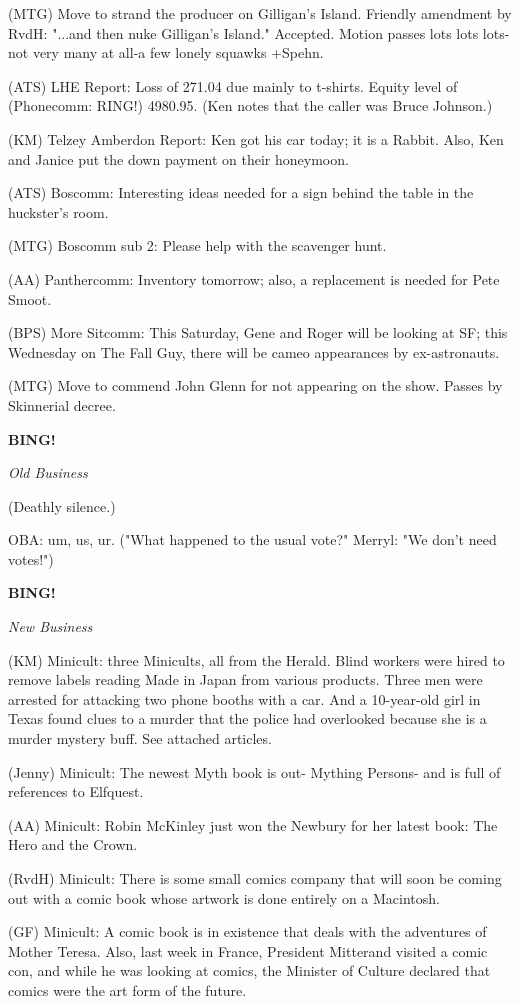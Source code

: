 \documentclass[12pt]{article}
\newcommand{\bing}{{\bf BING!} }
\newcommand{\goto}[1]{\bing \vskip 12pt \centerline{{\em{#1}}}}
\begin{document}
(MTG) Move to strand the producer on Gilligan's Island. Friendly amendment by RvdH: "...and then nuke Gilligan's Island." Accepted. Motion passes lots lots lots-not very many at all-a few lonely squawks +Spehn.

(ATS) LHE Report: Loss of 271.04 due mainly to t-shirts. Equity level of (Phonecomm: RING!) 4980.95. (Ken notes that the caller was Bruce Johnson.)

(KM) Telzey Amberdon Report: Ken got his car today; it is a Rabbit. Also, Ken and Janice put the down payment on their honeymoon.

(ATS) Boscomm: Interesting ideas needed for a sign behind the table in the huckster's room.

(MTG) Boscomm sub 2: Please help with the scavenger hunt.

(AA) Panthercomm: Inventory tomorrow; also, a replacement is needed for Pete Smoot.

(BPS) More Sitcomm: This Saturday, Gene and Roger will be looking at SF; this Wednesday on The Fall Guy, there will be cameo appearances by ex-astronauts.

(MTG) Move to commend John Glenn for not appearing on the show. Passes by Skinnerial decree.

\goto{Old Business}

(Deathly silence.)

OBA: um, us, ur. ("What happened to the usual vote?" Merryl: "We don't need votes!")

\goto{New Business}

(KM) Minicult: three Minicults, all from the Herald. Blind workers were hired to remove labels reading Made in Japan from various products. Three men were arrested for attacking two phone booths with a car. And a 10-year-old girl in Texas found clues to a murder that the police had overlooked because she is a murder mystery buff. See attached articles.

(Jenny) Minicult: The newest Myth book is out- Mything Persons- and is full of references to Elfquest.

(AA) Minicult: Robin McKinley just won the Newbury for her latest book: The Hero and the Crown.

(RvdH) Minicult: There is some small comics company that will soon be coming out with a comic book whose artwork is done entirely on a Macintosh.

(GF) Minicult: A comic book is in existence that deals with the adventures of Mother Teresa. Also, last week in France, President Mitterand visited a comic con, and while he was looking at comics, the Minister of Culture declared that comics were the art form of the future.
\end{document}
